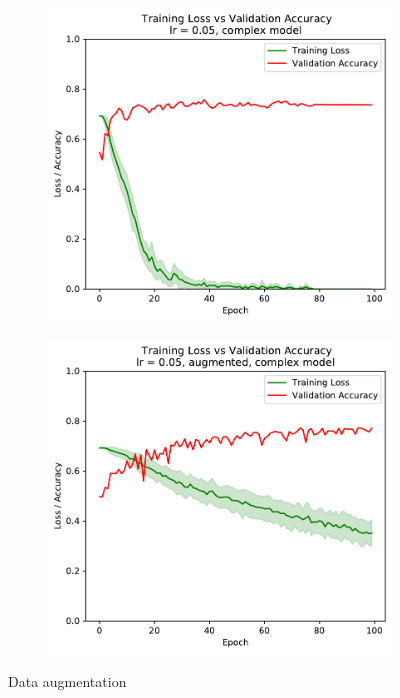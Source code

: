 \documentclass[sigconf,nonacm]{acmart}
\begin{document}
\begin{figure}[ht]
\begin{subfigure}[c]{0.45\columnwidth}
\includegraphics[width=\textwidth]{plot_complex_0_05.pdf}
\end{subfigure}
\hspace{2pt}
\begin{subfigure}[c]{0.45\columnwidth}
\includegraphics[width=\textwidth]{plot_augmented_complex_0_05.pdf}
\end{subfigure}
\vspace{-.7\baselineskip}
\caption{Data augmentation}
\label{part2:augmentation}
\end{figure}
  
\end{document}

